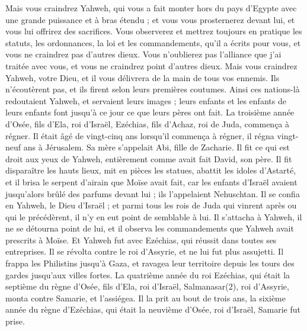 \begin{multicols}{2}
Mais vous craindrez Yahweh, qui vous a fait monter hors du pays d’Egypte avec une grande puissance et à bras étendu ; et vous vous prosternerez devant lui, et vous lui offrirez des sacrifices.
Vous observerez et mettrez toujours en pratique les statuts, les ordonnances, la loi et les commandements, qu’il a écrits pour vous, et vous ne craindrez pas d’autres dieux.
Vous n’oublierez pas l’alliance que j’ai traitée avec vous, et vous ne craindrez point d’autres dieux.
Mais vous craindrez Yahweh, votre Dieu, et il vous délivrera de la main de tous vos ennemis.
Ils n’écoutèrent pas, et ils firent selon leurs premières coutumes.
Ainsi ces nations-là redoutaient Yahweh, et servaient leurs images ; leurs enfants et les enfants de leurs enfants font jusqu’à ce jour ce que leurs pères ont fait.
\VerseOne{}La troisième année d’Osée, fils d’Ela, roi d’Israël, Ezéchias, fils d’Achaz, roi de Juda, commença à régner.
Il était âgé de vingt-cinq ans lorsqu’il commença à régner, il régna vingt-neuf ans à Jérusalem. Sa mère s’appelait Abi, fille de Zacharie.
Il fit ce qui est droit aux yeux de Yahweh, entièrement comme avait fait David, son père.
Il fit disparaître les hauts lieux, mit en pièces les statues, abattit les idoles d’Astarté, et il brisa le serpent d’airain que Moïse avait fait, car les enfants d’Israël avaient jusqu’alors brûlé des parfums devant lui ; ils l’appelaient Nehuschtan.
Il se confia en Yahweh, le Dieu d’Israël ; et parmi tous les rois de Juda qui vinrent après ou qui le précédèrent, il n’y en eut point de semblable à lui.
Il s’attacha à Yahweh, il ne se détourna point de lui, et il observa les commandements que Yahweh avait prescrits à Moïse.
Et Yahweh fut avec Ezéchias, qui réussit dans toutes ses entreprises. Il se révolta contre le roi d’Assyrie, et ne lui fut plus assujetti.
Il frappa les Philistins jusqu’à Gaza, et ravagea leur territoire depuis les tours des gardes jusqu’aux villes fortes.
La quatrième année du roi Ezéchias, qui était la septième du règne d’Osée, fils d’Ela, roi d’Israël, Salmanasar(2), roi d’Assyrie, monta contre Samarie, et l’assiégea.
Il la prit au bout de trois ans, la sixième année du règne d’Ezéchias, qui était la neuvième d’Osée, roi d’Israël, Samarie fut prise.

\end{multicols}
